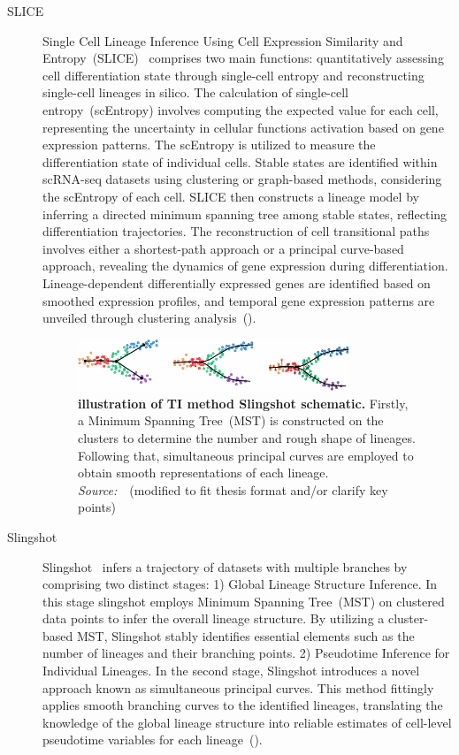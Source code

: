\begin{description}
  \item[SLICE]
  Single Cell Lineage Inference Using Cell Expression Similarity and Entropy~(SLICE)~\citep{guo2017slice} comprises two main functions: quantitatively assessing cell differentiation state through single-cell entropy and reconstructing single-cell lineages in silico. The calculation of single-cell entropy~(scEntropy) involves computing the expected value for each cell, representing the uncertainty in cellular functions activation based on gene expression patterns. The scEntropy is utilized to measure the differentiation state of individual cells. Stable states are identified within scRNA-seq datasets using clustering or graph-based methods, considering the scEntropy of each cell. SLICE then constructs a lineage model by inferring a directed minimum spanning tree among stable states, reflecting differentiation trajectories. The reconstruction of cell transitional paths involves either a shortest-path approach or a principal curve-based approach, revealing the dynamics of gene expression during differentiation. Lineage-dependent differentially expressed genes are identified based on smoothed expression profiles, and temporal gene expression patterns are unveiled through clustering analysis~().

\begin{figure}[h!]
  	\centering
  	\includegraphics[width=0.8\textwidth]{TI_Alg_slingshot/fig}
  	\vspace{0.1cm}
  	\caption[Illustration of TI method Slingshot schematic.]{\textbf{illustration of TI method Slingshot schematic.}
  	Firstly, a Minimum Spanning Tree~(MST) is constructed on the clusters to determine the number and rough shape of lineages. Following that, simultaneous principal curves are employed to obtain smooth representations of each lineage. \emph{Source:~\cite{street2018slingshot}}~(modified to fit thesis format and/or clarify key points)
  	}
  	\label{fig:TI_Alg_slingshot}
\end{figure}

  \item[Slingshot]
  Slingshot~\citep{street2018slingshot} infers a trajectory of datasets with multiple branches by comprising two distinct stages: 1) Global Lineage Structure Inference. In this stage slingshot employs Minimum Spanning Tree~(MST) on clustered data points to infer the overall lineage structure. By utilizing a cluster-based MST, Slingshot stably identifies essential elements such as the number of lineages and their branching points. 2) Pseudotime Inference for Individual Lineages. In the second stage, Slingshot introduces a novel approach known as simultaneous principal curves. This method fittingly applies smooth branching curves to the identified lineages, translating the knowledge of the global lineage structure into reliable estimates of cell-level pseudotime variables for each lineage~().


\end{description}
